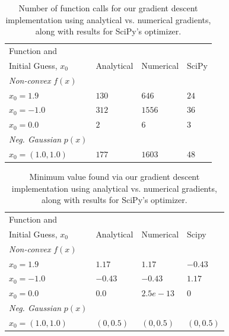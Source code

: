 \documentclass[10pt]{article}
\begin{document}
\begin{table}
\begin{tabular}{|l|l|l|l|}
\hline
Function and & & &\\ Initial Guess, $x_0$ & Analytical & Numerical & SciPy \\ \hline
\textit{Non-convex} $f(x)$ & & &\\ \hline
$x_0 = 1.9$ & $130$ & $646$ & $24$\\\hline
$x_0 = -1.0$ & $312$ & $1556$ & $36$ \\ \hline
$x_0 = 0.0$ & $2$ & $6$ & $3$\\ \hline
\textit{Neg. Gaussian} $p(x)$ & & & \\ \hline
$x_0 = (1.0,1.0)$ & $177$ & $1603$ & $48$ \\ \hline
\end{tabular}
\label{numfunctioncalls}
\caption{Number of function calls for our gradient descent implementation using analytical vs. numerical gradients, along with results for SciPy's optimizer.}
\end{table}
\begin{table}
\begin{tabular}{|l|l|l|l|}
\hline
Function and & & &\\ Initial Guess, $x_0$ & Analytical & Numerical & Scipy \\ \hline
\textit{Non-convex} $f(x)$ & & &\\ \hline
$x_0 = 1.9$ & $1.17$ & $1.17$ & $-0.43$\\\hline
$x_0 = -1.0$ & $-0.43$ & $-0.43$ & $1.17$ \\ \hline
$x_0 = 0.0$ & $0.0$ & $2.5e-13$ & $0$\\ \hline
\textit{Neg. Gaussian} $p(x)$ & & & \\ \hline
$x_0 = (1.0,1.0)$ & $(0,0.5)$ & $(0,0.5)$ & $(0,0.5)$ \\ \hline
\end{tabular}
\label{minvalues}
\caption{Minimum value found via our gradient descent implementation using analytical vs. numerical gradients, along with results for SciPy's optimizer.}
\end{table}

%
\end{document}
